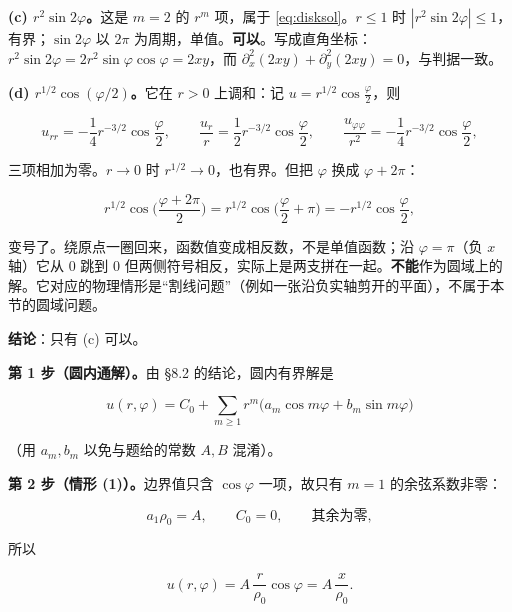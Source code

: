 \textbf{(c) $r^2\sin2\varphi$。}这是 $m=2$ 的 $r^m$ 项，属于 \eqref{eq:disksol}。$r\le1$ 时 $|r^2\sin2\varphi|\le1$，有界；$\sin2\varphi$ 以 $2\pi$ 为周期，单值。\textbf{可以}。写成直角坐标：$r^2\sin2\varphi=2r^2\sin\varphi\cos\varphi=2xy$，而 $\partial_x^2(2xy)+\partial_y^2(2xy)=0$，与判据一致。

\textbf{(d) $r^{1/2}\cos(\varphi/2)$。}它在 $r>0$ 上调和：记 $u=r^{1/2}\cos\frac\varphi2$，则

\[
u_{rr}=-\frac14r^{-3/2}\cos\frac\varphi2,\qquad
\frac{u_r}{r}=\frac12r^{-3/2}\cos\frac\varphi2,\qquad
\frac{u_{\varphi\varphi}}{r^2}=-\frac14r^{-3/2}\cos\frac\varphi2,
\]

三项相加为零。$r\to0$ 时 $r^{1/2}\to0$，也有界。但把 $\varphi$ 换成 $\varphi+2\pi$：

\[
r^{1/2}\cos\Big(\frac{\varphi+2\pi}{2}\Big)=r^{1/2}\cos\Big(\frac\varphi2+\pi\Big)=-r^{1/2}\cos\frac\varphi2 ,
\]

变号了。绕原点一圈回来，函数值变成相反数，不是单值函数；沿 $\varphi=\pi$（负 $x$ 轴）它从 $0$ 跳到 $0$ 但两侧符号相反，实际上是两支拼在一起。\textbf{不能}作为圆域上的解。它对应的物理情形是“割线问题”（例如一张沿负实轴剪开的平面），不属于本节的圆域问题。

\textbf{结论}：只有 (c) 可以。





\textbf{第 1 步（圆内通解）。}由 \S8.2 的结论，圆内有界解是

\[
u(r,\varphi)=C_0+\sum_{m\ge1}r^m\big(a_m\cos m\varphi+b_m\sin m\varphi\big)
\]

（用 $a_m,b_m$ 以免与题给的常数 $A,B$ 混淆）。

\textbf{第 2 步（情形 (1)）。}边界值只含 $\cos\varphi$ 一项，故只有 $m=1$ 的余弦系数非零：

\[
a_1\rho_0=A,\qquad C_0=0,\qquad \text{其余为零},
\]

所以

\[
u(r,\varphi)=A\,\frac{r}{\rho_0}\cos\varphi=A\,\frac{x}{\rho_0}.
\]

